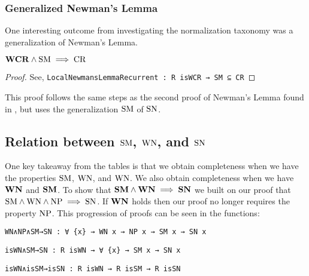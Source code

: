 \subsubsection{Generalized Newman's Lemma}\label{subsec:newnewman}
One interesting outcome from investigating the normalization taxonomy was a generalization of Newman's Lemma. 

\begin{proposition}
    $\mathbf{WCR} \land \mathrm{SM} \implies \mathrm{CR}$
\end{proposition}
\begin{proof}
    See, \verb|LocalNewmansLemmaRecurrent : R isWCR → SM ⊆ CR|
\end{proof}

This proof follows the same steps as the second proof of Newman's Lemma found in \terese, but 
uses the generalization $\mathrm{SM}$ of $\mathrm{SN}$. 

\subsection{Relation between $\mathrm{SM}$, $\mathrm{WN}$, and $\mathrm{SN}$}
One key takeaway from the tables is that we obtain completeness when we have the properties $\mathrm{SM}$, $\mathrm{WN}$, and $\mathrm{WN}$. We also 
obtain completeness when we have $\mathbf{WN}$ and $\mathbf{SM}$. 
To show that $\mathbf{SM} \land \mathbf{WN} \implies \mathbf{SN}$ we built on our proof that $\mathrm{SM} \land \mathrm{WN} \land \mathrm{NP} \implies \mathrm{SN}$. If $\mathbf{WN}$ holds 
then our proof no longer requires the property $\mathrm{NP}$. This progression of proofs can be seen in the functions:

\verb|WN∧NP∧SM→SN : ∀ {x} → WN x → NP x → SM x → SN x| 

\verb|isWN∧SM→SN : R isWN → ∀ {x} → SM x → SN x|

\verb|isWN∧isSM→isSN : R isWN → R isSM → R isSN| 


